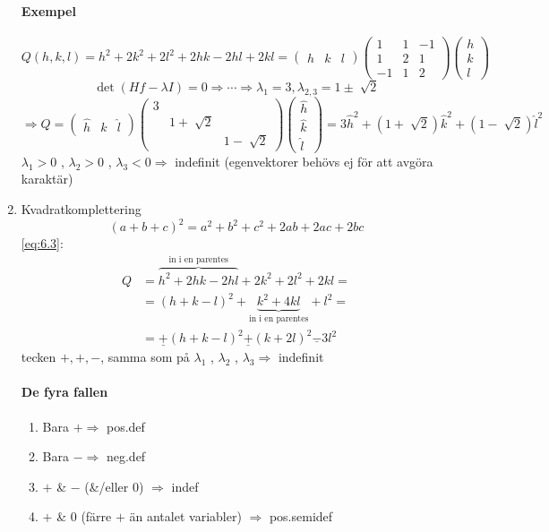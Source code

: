 \documentclass[a4paper]{article}
\let\olddet\det
\renewcommand*{\det}[1]{\olddet(#1)}
\let\oldsqrt\sqrt
\renewcommand*{\sqrt}[2][\ ]{\oldsqrt[#1]{#2} }
\begin{document}
\begin{enumerate}
\paragraph{Exempel}
\begin{equation}\label{eq:6.3}
	Q(h,k,l) = h^2 + 2k^2 + 2l^2 + 2hk - 2hl + 2kl =
	\begin{pmatrix}
		h & k & l
	\end{pmatrix}
	\begin{pmatrix}
		1 & 1 & -1 \\
		1 & 2 & 1 \\
		-1 & 1 & 2
	\end{pmatrix}
	\begin{pmatrix}
		h \\
		k \\
		l
	\end{pmatrix}
\end{equation}
$$
	\det{Hf - \lambda I} = 0 \Rightarrow \cdots \Rightarrow \lambda_1 = 3, \lambda_{2,3} = 1 \pm \sqrt{2}
$$
$$
	\Rightarrow Q =
	\begin{pmatrix}
		\hat{h} & \hat{k} & \hat{l}
	\end{pmatrix}
	\begin{pmatrix}
		3 & & \\
		& 1+\sqrt{2} & \\
		& & 1-\sqrt{2}
	\end{pmatrix}
	\begin{pmatrix}
		\hat{h} \\
		\hat{k} \\
		\hat{l}
	\end{pmatrix}
	= 3\hat{h}^2 + (1+\sqrt{2})\hat{k}^2 + (1-\sqrt{2})\hat{l}^2
$$
$\lambda_1 > 0$ , $\lambda_2 > 0$ , $\lambda_3 < 0 \Rightarrow$ indefinit (egenvektorer behövs ej för att avgöra karaktär)

\newpage
\item Kvadratkomplettering
$$
	(a+b+c)^2 = a^2 + b^2 + c^2 + 2ab + 2ac + 2bc
$$
\eqref{eq:6.3}:
\begin{align*}
	Q &= \overbrace{h^2 + 2hk - 2hl}^{\text{in i en parentes}} + 2k^2 + 2l^2 + 2kl = \\
	  &= (h+k-l)^2 + \underbrace{k^2 + 4kl}_{\text{in i en parentes}} + l^2 = \\
	  &= \underline{+}(h+k-l)^2 \underline{+} (k+2l)^2 \underline{-} 3l^2
\end{align*}
tecken $+, +, -$, samma som på $\lambda_1$ , $\lambda_2$ , $\lambda_3 \Rightarrow$ indefinit

\paragraph{De fyra fallen}
\begin{enumerate}
\item Bara $+ \Rightarrow$ pos.def
\item Bara $- \Rightarrow$ neg.def
\item $+$ \& $-$ (\&/eller 0) $\Rightarrow$ indef
\item $+$ \& $0$ (färre $+$ än antalet variabler) $\Rightarrow$ pos.semidef
\end{enumerate}
\end{enumerate}
\end{document}
